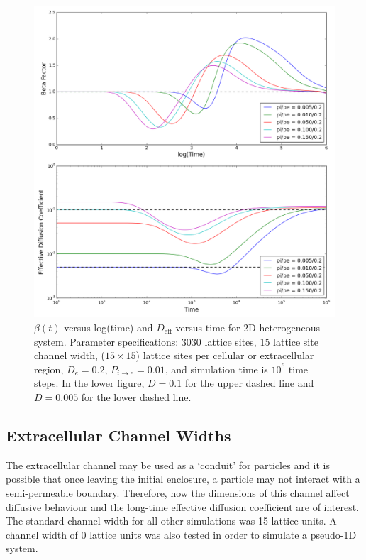 	\begin{figure}[h!]
		\centering
		\includegraphics[width=1.0\linewidth]{../images/2D/pipe_beta_deff_2D}
		\caption{$ \beta (t) $ versus log(time) and $ D_\textrm{eff} $ versus time for 2D heterogeneous system. Parameter specifications: 3030 lattice sites, 15 lattice site channel width, ($ 15 \times 15 $) lattice sites per cellular or extracellular region, $ D_e = 0.2 $, $ P_{i \rightarrow e} = 0.01 $, and simulation time is $ 10^6 $ time steps. In the lower figure, $ D = 0.1 $ for the upper dashed line and $ D = 0.005 $ for the lower dashed line.}
		\label{fig:pipe_beta_deff_2D}
	\end{figure}
	
\clearpage
\subsection{Extracellular Channel Widths}
\label{sec:2D-channel-width}
	
	The extracellular channel may be used as a `conduit' for particles and it is possible that once leaving the initial enclosure, a particle may not interact with a semi-permeable boundary. Therefore, how the dimensions of this channel affect diffusive behaviour and the long-time effective diffusion coefficient are of interest. The standard channel width for all other simulations was 15 lattice units. A channel width of 0 lattice units was also tested in order to simulate a pseudo-1D system. 
	
